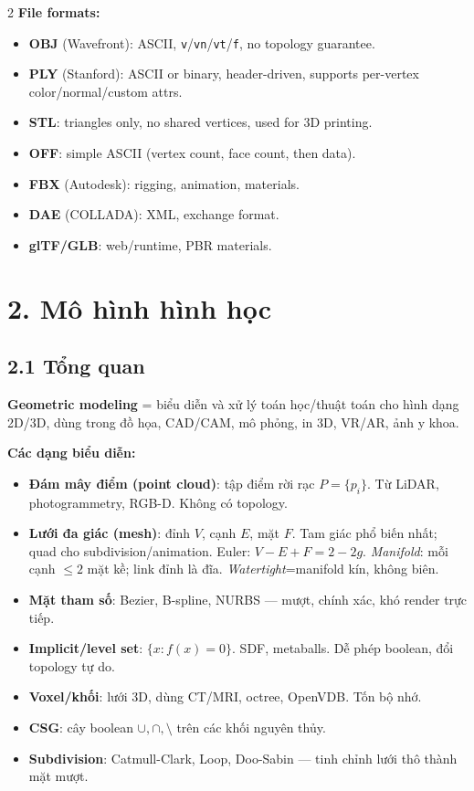 \begin{paracol}{2}
\textbf{File formats:}
\begin{itemize}[leftmargin=*,nosep]
  \item \textbf{OBJ} (Wavefront): ASCII, \texttt{v}/\texttt{vn}/\texttt{vt}/\texttt{f}, no topology guarantee.
  \item \textbf{PLY} (Stanford): ASCII or binary, header-driven, supports per-vertex color/normal/custom attrs.
  \item \textbf{STL}: triangles only, no shared vertices, used for 3D printing.
  \item \textbf{OFF}: simple ASCII (vertex count, face count, then data).
  \item \textbf{FBX} (Autodesk): rigging, animation, materials.
  \item \textbf{DAE} (COLLADA): XML, exchange format.
  \item \textbf{glTF/GLB}: web/runtime, PBR materials.
\end{itemize}

\switchcolumn

\section*{2. Mô hình hình học}
\subsection*{2.1 Tổng quan}
\textbf{Geometric modeling} = biểu diễn và xử lý toán học/thuật toán cho hình dạng 2D/3D, dùng trong đồ họa, CAD/CAM, mô phỏng, in 3D, VR/AR, ảnh y khoa.

\textbf{Các dạng biểu diễn:}
\begin{itemize}[leftmargin=*,nosep]
  \item \textbf{Đám mây điểm (point cloud)}: tập điểm rời rạc $P=\{p_i\}$. Từ LiDAR, photogrammetry, RGB-D. Không có topology.
  \item \textbf{Lưới đa giác (mesh)}: đỉnh $V$, cạnh $E$, mặt $F$. Tam giác phổ biến nhất; quad cho subdivision/animation. Euler: $V-E+F=2-2g$. \emph{Manifold}: mỗi cạnh $\le 2$ mặt kề; link đỉnh là đĩa. \emph{Watertight}=manifold kín, không biên.
  \item \textbf{Mặt tham số}: Bezier, B-spline, NURBS — mượt, chính xác, khó render trực tiếp.
  \item \textbf{Implicit/level set}: $\{x:f(x)=0\}$. SDF, metaballs. Dễ phép boolean, đổi topology tự do.
  \item \textbf{Voxel/khối}: lưới 3D, dùng CT/MRI, octree, OpenVDB. Tốn bộ nhớ.
  \item \textbf{CSG}: cây boolean $\cup,\cap,\setminus$ trên các khối nguyên thủy.
  \item \textbf{Subdivision}: Catmull-Clark, Loop, Doo-Sabin — tinh chỉnh lưới thô thành mặt mượt.
\end{itemize}


\end{paracol}
